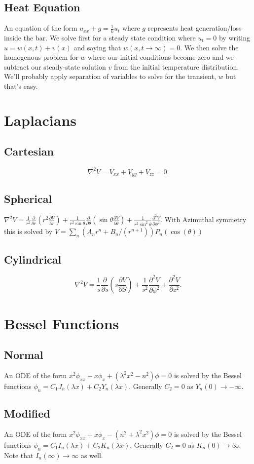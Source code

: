 \documentclass[10pt,landscape,letterpaper]{cheatsheet}
\begin{document}
\subsection*{Heat Equation}
An equation of the form
$u_{xx}+g=\frac{1}{k}u_t$
where $g$ represents heat generation/loss inside the bar.
We solve first for a steady state condition where $u_t=0$
by writing $u=w(x,t)+v(x)$ and saying that $w(x,t\to\infty)=0$.
We then solve the homogenous problem for $w$ where our initial conditions become
zero and we subtract our steady-state solution $v$ from the initial temperature distribution.
We'll probably apply separation of variables to solve for the transient, $w$ but that's easy.
\section*{Laplacians}
\subsection*{Cartesian}
$$\nabla^2{V}=V_{xx}+V_{yy}+V_{zz}=0.$$
\subsection*{Spherical}
$\displaystyle\nabla^2{V}=\frac{1}{r^2}\frac{\partial}{\partial r}\left(r^2\frac{\partial V}{\partial r}\right)+
\frac{1}{r^2\sin\theta}\frac{\partial}{\partial \theta}\left(\sin\theta\frac{\partial V}{\partial \theta}\right)
+\frac{1}{r^2\sin^2\theta}\frac{\partial^2 V}{\partial \phi^2}.$
With Azimuthal symmetry this is solved by 
$V=\sum_n(A_nr^n+B_n/(r^{n+1}))P_n(\cos(\theta))$
\subsection{Cylindrical}
$$\nabla^2 V=\frac{1}{s}\frac{\partial}{\partial s}\left(s\frac{\partial V}{\partial S}\right)
+\frac{1}{s^2}\frac{\partial^2 V}{\partial\phi^2}+\frac{\partial^2 V}{\partial z^2}.
$$
\section*{Bessel Functions}
\subsection*{Normal}
An ODE of the form
$x^2\phi_{xx}+x\phi_x+(\lambda^2x^2-n^2)\phi=0$
is solved by the Bessel functions
$\phi_n=C_1J_n(\lambda x)+C_2Y_n(\lambda x)$.
Generally $C_2=0$ as $Y_n(0)\to -\infty$.
\subsection*{Modified}
An ODE of the form
$x^2\phi_{xx}+x\phi_x-(n^2+\lambda^2x^2)\phi=0$
is solved by the Bessel functions
$\phi_n=C_1I_n(\lambda x)+C_2K_n(\lambda x)$.
Generally $C_2=0$ as $K_n(0)\to \infty$. Note that 
$I_n(\infty)\to\infty$ as well.
\end{document}
